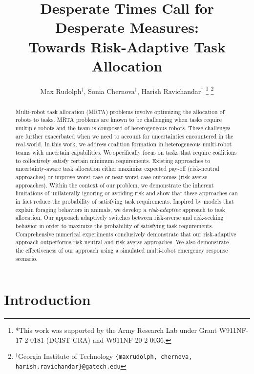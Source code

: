 \documentclass[letterpaper, 10 pt, conference]{ieeeconf}  %
\title{\LARGE \bf
Desperate Times Call for Desperate Measures: \\ Towards Risk-Adaptive Task Allocation
}
\author{Max Rudolph$^{\dagger}$, Sonia Chernova$^{\dagger}$, Harish Ravichandar$^{\dagger}$%
\thanks{*This work was supported by the Army Research Lab under Grant W911NF-17-2-0181 (DCIST CRA) and W911NF-20-2-0036.}%
\thanks{$^{\dagger}$Georgia Institute of Technology {\tt\small \{maxrudolph, chernova, harish.ravichandar\}@gatech.edu}}%
}
\begin{document}
\maketitle
\thispagestyle{empty}
\pagestyle{empty}


\begin{abstract}
Multi-robot task allocation (MRTA) problems involve optimizing the allocation of robots to tasks. MRTA problems are known to be challenging when tasks require multiple robots and the team is composed of heterogeneous robots. These challenges are further exacerbated when we need to account for uncertainties encountered in the real-world. In this work, we address coalition formation in heterogeneous multi-robot teams with uncertain capabilities. We specifically focus on tasks that require coalitions to collectively satisfy certain minimum requirements. Existing approaches to uncertainty-aware task allocation either maximize expected pay-off (risk-neutral approaches) or improve worst-case or near-worst-case outcomes (risk-averse approaches). Within the context of our problem, we demonstrate the inherent limitations of unilaterally ignoring or avoiding risk and show that these approaches can in fact reduce the probability of satisfying task requirements. Inspired by models that explain foraging behaviors in animals, we develop a \textit{risk-adaptive} approach to task allocation. Our approach adaptively switches between risk-averse and risk-seeking behavior in order to maximize the probability of satisfying task requirements. Comprehensive numerical experiments conclusively demonstrate that our risk-adaptive approach outperforms risk-neutral and risk-averse approaches. We also demonstrate the effectiveness of our approach using a simulated multi-robot emergency response scenario.
\end{abstract}


\section{Introduction}
\end{document}
